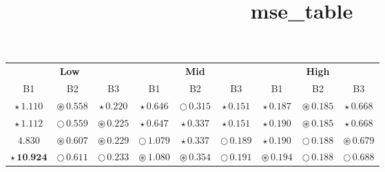 \documentclass[
]{article}
\title{mse\_table}
\author{}
\date{\vspace{-2.5em}}
\begin{document}
\maketitle

\begin{table}[!h]
\centering
\begin{tabular}[t]{ccccccccc}
\toprule
\multicolumn{3}{c}{\textbf{Low}} & \multicolumn{3}{c}{\textbf{Mid}} & \multicolumn{3}{c}{\textbf{High}} \\
\cmidrule(l{3pt}r{3pt}){1-3} \cmidrule(l{3pt}r{3pt}){4-6} \cmidrule(l{3pt}r{3pt}){7-9}
B1 & B2 & B3 & B1 & B2 & B3 & B1 & B2 & B3\\
\midrule
\cellcolor[HTML]{2297E6}$\star\,\textit{1.110}$ & \cellcolor[HTML]{2297E6}$\circledast\,\textit{0.558}$ & \cellcolor[HTML]{F5C710}$\star\,\textit{0.220}$ & \cellcolor[HTML]{DF536B}$\star\,\textit{0.646}$ & \cellcolor[HTML]{F5C710}$\bigcirc\,\textit{0.315}$ & \cellcolor[HTML]{2297E6}$\star\,\textit{0.151}$ & \cellcolor[HTML]{F5C710}$\star\,\textit{0.187}$ & \cellcolor[HTML]{DF536B}$\circledast\,\textit{0.185}$ & \cellcolor[HTML]{DF536B}$\star\,\textit{0.668}$\\
\cellcolor[HTML]{DF536B}$\star\,\textit{1.112}$ & \cellcolor[HTML]{2297E6}$\bigcirc\,\textit{0.559}$ & \cellcolor[HTML]{F5C710}$\circledast\,\textit{0.225}$ & \cellcolor[HTML]{2297E6}$\star\,\textit{0.647}$ & \cellcolor[HTML]{DF536B}$\star\,\textit{0.337}$ & \cellcolor[HTML]{DF536B}$\star\,\textit{0.151}$ & \cellcolor[HTML]{DF536B}$\star\,\textit{0.190}$ & \cellcolor[HTML]{2297E6}$\circledast\,\textit{0.185}$ & \cellcolor[HTML]{2297E6}$\star\,\textit{0.668}$\\
\cellcolor[HTML]{FFFFFF}$4.830$ & \cellcolor[HTML]{DF536B}$\circledast\,\textit{0.607}$ & \cellcolor[HTML]{2297E6}$\circledast\,\textit{0.229}$ & \cellcolor[HTML]{DF536B}$\bigcirc\,\textit{1.079}$ & \cellcolor[HTML]{2297E6}$\star\,\textit{0.337}$ & \cellcolor[HTML]{DF536B}$\bigcirc\,\textit{0.189}$ & \cellcolor[HTML]{2297E6}$\star\,\textit{0.190}$ & \cellcolor[HTML]{2297E6}$\bigcirc\,\textit{0.188}$ & \cellcolor[HTML]{DF536B}$\circledast\,\textit{0.679}$\\
\cellcolor[HTML]{2297E6}$\star\,\textbf{10.924}$ & \cellcolor[HTML]{DF536B}$\bigcirc\,\textit{0.611}$ & \cellcolor[HTML]{F5C710}$\bigcirc\,\textit{0.233}$ & \cellcolor[HTML]{DF536B}$\circledast\,\textit{1.080}$ & \cellcolor[HTML]{2297E6}$\circledast\,\textit{0.354}$ & \cellcolor[HTML]{2297E6}$\bigcirc\,\textit{0.191}$ & \cellcolor[HTML]{DF536B}$\circledast\,\textit{0.194}$ & \cellcolor[HTML]{DF536B}$\bigcirc\,\textit{0.188}$ & \cellcolor[HTML]{DF536B}$\bigcirc\,\textit{0.688}$\\

\end{tabular}
\end{table}
\end{document}
